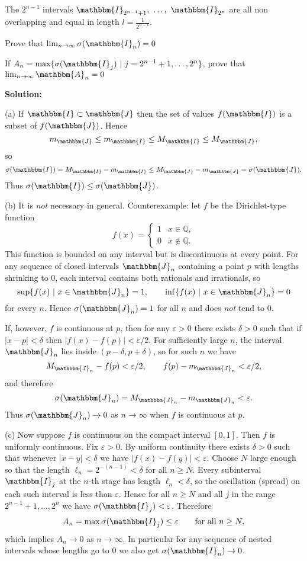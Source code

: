 \documentclass[14pt]{extarticle}
\begin{document}
\begin{enumerate}
\begin{enumerate}
The $2^{n-1}$ intervals $\mathbbm{I}_{2^{n-1}+1}, \ \dots, \ \mathbbm{I}_{2^n}$ are all non overlapping and equal in length $l = \frac{1}{2^{n-1}}$.

Prove that $\lim_{n\to\infty} \sigma(\mathbbm{I}_n) = 0$

If $A_n = \text{max}\{\sigma(\mathbbm{I}_j) \ | \ j = 2^{n-1}+1, \dots, 2^n\}$, prove that $\lim_{n\to\infty} \mathbbm{A}_n = 0$


\end{enumerate}

\textbf{Solution:}

(a) If $\mathbbm{I}\subset\mathbbm{J}$ then the set of values $f(\mathbbm{I})$ is a subset of $f(\mathbbm{J})$. Hence
\[
m_{\mathbbm{J}}\le m_{\mathbbm{I}}\le M_{\mathbbm{I}}\le M_{\mathbbm{J}},
\]
so
\[
\sigma(\mathbbm{I})=M_{\mathbbm{I}}-m_{\mathbbm{I}}\le M_{\mathbbm{J}}-m_{\mathbbm{J}}=\sigma(\mathbbm{J}).
\]
Thus $\sigma(\mathbbm{I})\le\sigma(\mathbbm{J})$.

(b) It is \emph{not} necessary in general. Counterexample: let $f$ be the Dirichlet-type function
\[
f(x)=\begin{cases}1 & x\in\mathbb Q,\\ 0 & x\notin\mathbb Q.\end{cases}
\]
This function is bounded on any interval but is discontinuous at every point. For any sequence of closed intervals $\mathbbm{J}_n$ containing a point $p$ with lengths shrinking to $0$, each interval contains both rationals and irrationals, so
\[
\sup\{f(x) \ | \ x \in {\mathbbm{J}_n}\}=1,\qquad \inf\{f(x) \ | \ x \in {\mathbbm{J}_n}\}=0
\]
for every $n$. Hence $\sigma(\mathbbm{J}_n)=1$ for all $n$ and does \emph{not} tend to $0$.

If, however, $f$ is continuous at $p$, then for any $\varepsilon>0$ there exists $\delta>0$ such that if $|x-p|<\delta$ then $|f(x)-f(p)|<\varepsilon/2$. For sufficiently large $n$, the interval $\mathbbm{J}_n$ lies inside $(p-\delta,p+\delta)$, so for such $n$ we have
\[
M_{\mathbbm{J}_n}-f(p)<\varepsilon/2,\qquad f(p)-m_{\mathbbm{J}_n}<\varepsilon/2,
\]
and therefore
\[
\sigma(\mathbbm{J}_n)=M_{\mathbbm{J}_n}-m_{\mathbbm{J}_n}<\varepsilon.
\]
Thus $\sigma(\mathbbm{J}_n)\to0$ as $n\to\infty$ when $f$ is continuous at $p$.

(c) Now suppose $f$ is continuous on the compact interval $[0,1]$. Then $f$ is uniformly continuous. Fix $\varepsilon>0$. By uniform continuity there exists $\delta>0$ such that whenever $|x-y|<\delta$ we have $|f(x)-f(y)|<\varepsilon$. Choose $N$ large enough so that the length $\ell_n=2^{-(n-1)}<\delta$ for all $n\ge N$. Every subinterval $\mathbbm{I}_j$ at the $n$-th stage has length $\ell_n<\delta$, so the oscillation (spread) on each such interval is less than $\varepsilon$. Hence for all $n\ge N$ and all $j$ in the range $2^{n-1}+1,\dots,2^n$ we have $\sigma(\mathbbm{I}_j)<\varepsilon$. Therefore
\[
A_n=\max{\sigma(\mathbbm{I}_j)}\le\varepsilon\qquad\text{for all }n\ge N,
\]
which implies $A_n\to0$ as $n\to\infty$. In particular for any sequence of nested intervals whose lengths go to $0$ we also get $\sigma(\mathbbm{I}_n)\to0$.


\end{enumerate}
\end{document}
